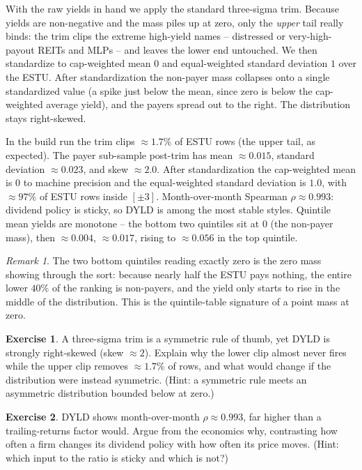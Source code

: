 \documentclass[11pt]{article}
\theoremstyle{definition}
\newtheorem{exercise}{Exercise}[section]
\theoremstyle{plain}
\theoremstyle{remark}
\newtheorem*{remark}{Remark}
\begin{document}
With the raw yields in hand we apply the standard three-sigma trim. Because yields are non-negative and the mass piles up at zero, only the \emph{upper} tail really binds: the trim clips the extreme high-yield names -- distressed or very-high-payout REITs and MLPs -- and leaves the lower end untouched. We then standardize to cap-weighted mean $0$ and equal-weighted standard deviation $1$ over the ESTU. After standardization the non-payer mass collapses onto a single standardized value (a spike just below the mean, since zero is below the cap-weighted average yield), and the payers spread out to the right. The distribution stays right-skewed.

\begin{observed}
In the build run the trim clips $\approx 1.7\%$ of ESTU rows (the upper tail, as expected). The payer sub-sample post-trim has mean $\approx 0.015$, standard deviation $\approx 0.023$, and skew $\approx 2.0$. After standardization the cap-weighted mean is $0$ to machine precision and the equal-weighted standard deviation is $1.0$, with $\approx 97\%$ of ESTU rows inside $[\pm 3]$. Month-over-month Spearman $\rho \approx 0.993$: dividend policy is sticky, so DYLD is among the most stable styles. Quintile mean yields are monotone -- the bottom two quintiles sit at $0$ (the non-payer mass), then $\approx 0.004$, $\approx 0.017$, rising to $\approx 0.056$ in the top quintile.
\end{observed}

\begin{remark}
The two bottom quintiles reading exactly zero is the zero mass showing through the sort: because nearly half the ESTU pays nothing, the entire lower $40\%$ of the ranking is non-payers, and the yield only starts to rise in the middle of the distribution. This is the quintile-table signature of a point mass at zero.
\end{remark}

\begin{exercise}
A three-sigma trim is a symmetric rule of thumb, yet DYLD is strongly right-skewed (skew $\approx 2$). Explain why the lower clip almost never fires while the upper clip removes $\approx 1.7\%$ of rows, and what would change if the distribution were instead symmetric. (Hint: a symmetric rule meets an asymmetric distribution bounded below at zero.)
\end{exercise}

\begin{exercise}
DYLD shows month-over-month $\rho \approx 0.993$, far higher than a trailing-returns factor would. Argue from the economics why, contrasting how often a firm changes its dividend policy with how often its price moves. (Hint: which input to the ratio is sticky and which is not?)
\end{exercise}
\end{document}
